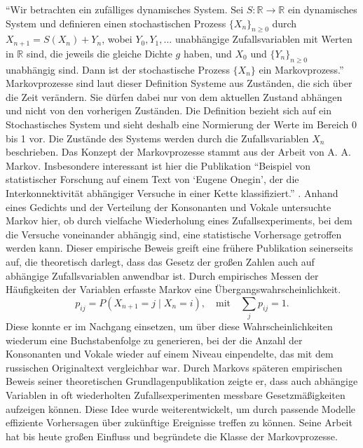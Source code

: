 \enquote{Wir betrachten ein zufälliges dynamisches System. Sei $S : \mathbb{R} \to \mathbb{R}$ ein dynamisches System und definieren einen stochastischen Prozess $\{X_n\}_{n \ge 0}$ durch $X_{n+1} = S(X_n) + Y_n$, wobei $Y_0, Y_1, \dots$ unabhängige Zufallsvariablen mit Werten in $\mathbb{R}$ sind, die jeweils die gleiche Dichte $g$ haben, und $X_0$ und $\{Y_n\}_{n \ge 0}$ unabhängig sind. Dann ist der stochastische Prozess $\{X_n\}$ ein Markovprozess.} \citep[S.~13]{KhalilGhaffari2023}
Markovprozesse sind laut dieser Definition Systeme aus Zuständen, die sich über die Zeit verändern.
Sie dürfen dabei nur von dem aktuellen Zustand abhängen und nicht von den vorherigen Zuständen.
Die Definition bezieht sich auf ein Stochastisches System und sieht deshalb eine Normierung der Werte im Bereich 0 bis 1 vor.
Die Zustände des Systems werden durch die Zufallsvariablen $X_n$ beschrieben.
\newline
Das Konzept der Markovprozesse stammt aus der Arbeit von A. A. Markov. Insbesondere interessant ist hier die Publikation \enquote{Beispiel von statistischer Forschung auf einem Text von \enquote{Eugene Onegin}, der die Interkonnektivität abhängiger Versuche in einer Kette klassifiziert.} \cite{markov1913onegin}.
Anhand eines Gedichts und der Verteilung der Konsonanten und Vokale untersuchte Markov hier, ob durch vielfache Wiederholung eines Zufallsexperiments, bei dem die Versuche voneinander abhängig sind, eine statistische Vorhersage getroffen werden kann. Dieser empirische Beweis greift eine frühere Publikation seinerseits auf, die theoretisch darlegt, dass das Gesetz der großen Zahlen auch auf abhängige
Zufallsvariablen anwendbar ist. Durch empirisches Messen der Häufigkeiten der Variablen erfasste Markov eine Übergangswahrscheinlichkeit. 
\begin{equation}
p_{ij} = P(X_{n+1} = j \mid X_n = i),
\quad \text{mit} \quad \sum_j p_{ij} = 1.
\label{eq:transition_prob}
\end{equation}
Diese konnte er im Nachgang einsetzen, um über diese Wahrscheinlichkeiten wiederum eine Buchstabenfolge zu generieren, bei der die Anzahl der Konsonanten und Vokale wieder auf einem Niveau einpendelte, das mit dem russischen Originaltext vergleichbar war. Durch Markovs späteren empirischen Beweis seiner theoretischen Grundlagenpublikation \citep{markov1906extension} zeigte er, dass auch abhängige Variablen in oft wiederholten Zufallsexperimenten messbare Gesetzmäßigkeiten aufzeigen können. Diese Idee wurde weiterentwickelt, um durch passende Modelle effiziente Vorhersagen über zukünftige Ereignisse treffen zu können.
Seine Arbeit hat bis heute großen Einfluss und begründete die Klasse der Markovprozesse.

